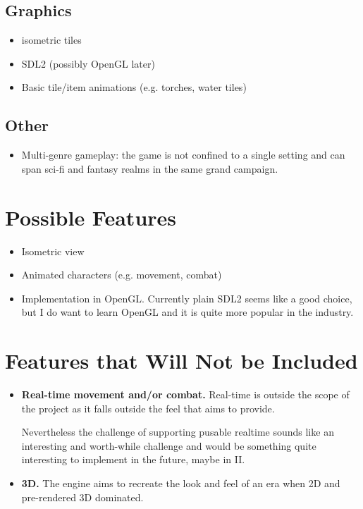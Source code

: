 \documentclass[a4paper,10pt]{book}
\begin{document}
\subsection{Graphics}
\begin{itemize}
  \item isometric tiles
  \item SDL2 (possibly OpenGL later)
  \item Basic tile/item animations (e.g. torches, water tiles)
\end{itemize}

\subsection{Other}
\begin{itemize}
  \item Multi-genre gameplay: the game is not confined to a single setting and can span sci-fi and fantasy realms in the same grand campaign.
\end{itemize}

\section{Possible Features}
\begin{itemize}
  \item Isometric view
  \item Animated characters (e.g. movement, combat)
  \item Implementation in OpenGL. Currently plain SDL2 seems like a good choice, but I do want to learn OpenGL and it is quite more popular in the industry.
\end{itemize}

\section{Features that Will Not be Included}
\begin{itemize}
  \item \textbf{Real-time movement and/or combat.} Real-time is outside the scope of the project as it falls outside the feel that \Gamename{} aims to provide.
 
  Nevertheless the challenge of supporting pusable realtime sounds like an interesting and worth-while challenge and would be something quite interesting to implement in the future, maybe in \Enginename{} II.
 
  \item \textbf{3D.} The engine aims to recreate the look and feel of an era when 2D and pre-rendered 3D dominated.
\end{itemize}
\end{document}
